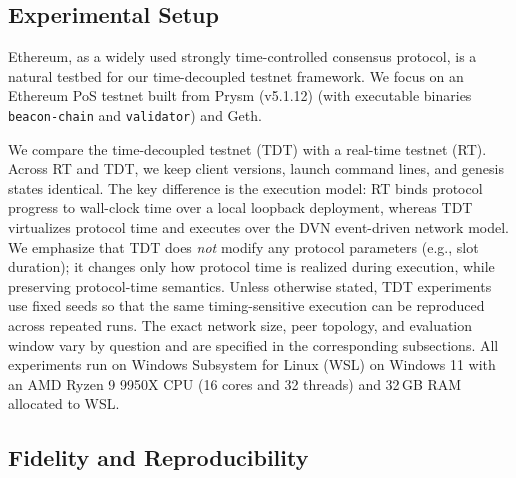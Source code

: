 \subsection{Experimental Setup}
\label{subsec:eval_setup}

Ethereum, as a widely used strongly time-controlled consensus protocol, is a natural testbed for our time-decoupled testnet framework. We focus on an Ethereum PoS testnet built from Prysm (v5.1.12) (with executable binaries \texttt{beacon-chain} and \texttt{validator}) and Geth.

We compare the time-decoupled testnet (TDT) with a real-time testnet (RT). Across RT and TDT, we keep client versions, launch command lines, and genesis states identical. The key difference is the execution model: RT binds protocol progress to wall-clock time over a local loopback deployment, whereas TDT virtualizes protocol time and executes over the DVN event-driven network model.
We emphasize that TDT does \emph{not} modify any protocol parameters (e.g., slot duration); it changes only how protocol time is realized during execution, while preserving protocol-time semantics. Unless otherwise stated, TDT experiments use fixed seeds so that the same timing-sensitive execution can be reproduced across repeated runs. The exact network size, peer topology, and evaluation window vary by question and are specified in the corresponding subsections.
All experiments run on Windows Subsystem for Linux (WSL) on Windows 11 with an AMD Ryzen 9 9950X CPU (16 cores and 32 threads) and 32\,GB RAM allocated to WSL.


\subsection{Fidelity and Reproducibility}
\label{subsec:eval_fidelity}

